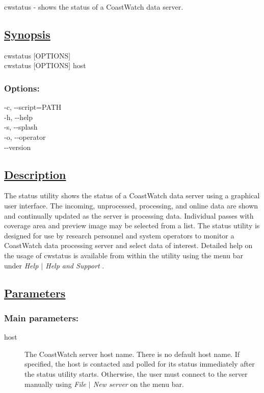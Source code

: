   cwstatus - shows the status of a CoastWatch data server.  
\subsection*{\underline{Synopsis}}


  cwstatus [OPTIONS] \\ 
 cwstatus [OPTIONS] host 
\subsubsection*{Options:}


  -c, -{-}script=PATH \\ 
 -h, -{-}help \\ 
 -s, -{-}splash \\ 
 -o, -{-}operator \\ 
 -{-}version \\ 

\subsection*{\underline{Description}}


  The status utility shows the status of a CoastWatch data server using a graphical user interface. The incoming, unprocessed, processing, and online data are shown and continually updated as the server is processing data. Individual passes with coverage area and preview image may be selected from a list. The status utility is designed for use by research personnel and system operators to monitor a CoastWatch data processing server and select data of interest. Detailed help on the usage of cwstatus is available from within the utility using the menu bar under \emph{Help $|$ Help and Support}
.
\subsection*{\underline{Parameters}}
\subsubsection*{Main parameters:}
\begin{description}
\item[ host ] The CoastWatch server host name. There is no default host name. If specified, the host is contacted and polled for its status immediately after the status utility starts. Otherwise, the user must connect to the server manually using \emph{File $|$ New server}
 on the menu bar. 

\end{description}
